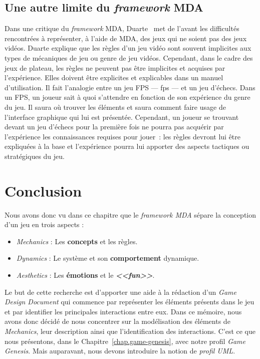 \subsection{Une autre limite du \emph{framework} MDA}
Dans une critique du \emph{framework} MDA, Duarte~\cite{GAMA_MDA} met de l'avant les difficultés  rencontr\'ees à représenter, \`a l'aide de MDA, des jeux qui ne soient pas des jeux vidéos. 
Duarte explique que les règles d'un jeu vidéo sont souvent implicites aux types de mécaniques de jeu ou genre de jeu vidéos. 
Cependant, dans le cadre des jeux de plateau, les règles ne peuvent pas être implicites et acquises par l'expérience. 
Elles doivent être explicites et explicables dans un manuel d'utilisation. 
Il fait l'analogie entre un jeu FPS --- \gls{fps} --- et un jeu d'échecs. Dans un FPS, un joueur sait à quoi s'attendre en fonction de son expérience du genre du jeu. 
Il saura o\`u trouver les éléments et saura comment faire usage de l'interface graphique qui lui est présentée. 
Cependant, un joueur se trouvant devant un jeu d'échecs pour la première fois ne pourra pas acquérir par l'exp\'erience les connaissances requises pour jouer~: les règles devront lui être expliquées à la base et l'expérience pourra lui apporter des aspects tactiques ou strat\'egiques du jeu.

\section{Conclusion}


Nous avons donc vu dans ce chapitre que le \emph{framework MDA} sépare la conception d'un jeu en trois aspects :
\begin{itemize}
    \item \emph{Mechanics} : Les \textbf{concepts} et les {règles}.
    \item \emph{Dynamics} : Le système et son \textbf{comportement} dynamique.
    \item \emph{Aesthetics} : Les \textbf{émotions} et le \textbf{\emph{<<fun>>}}.
\end{itemize}
Le but de cette recherche est d'apporter une aide à la rédaction d'un \emph{Game Design Document} qui commence par représenter les éléments présents dans le jeu et par identifier les principales interactions entre eux.
Dans ce mémoire, nous avons donc décidé de nous concentrer sur la modélisation des éléments de \emph{Mechanics}, leur description ainsi que l'identification des interactions.
C'est ce que nous présentons,  dans le Chapitre~\ref{chap.game-genesis}, avec notre profil \emph{Game Genesis}.
%
Mais auparavant, nous devons introduire la notion de \emph{profil UML}.
